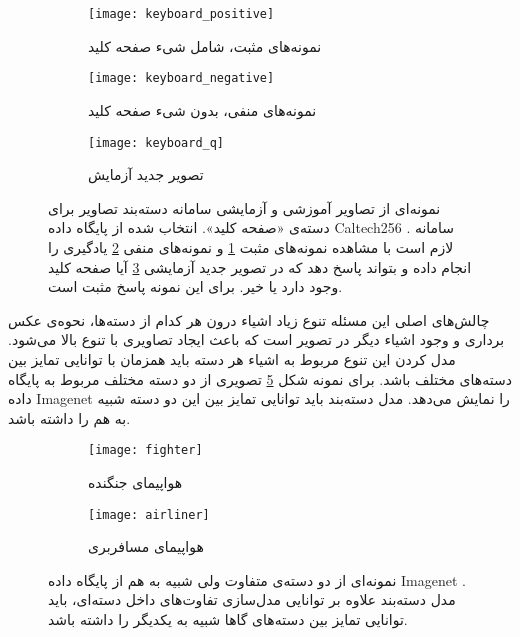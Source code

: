 \documentclass[11pt]{article}
\begin{document}
\begin{figure}[b!]
	\centering
	\begin{subfigure}[h]{0.5\textwidth}
		\texttt{[image: keyboard\_positive]}
		\caption{نمونه‌های مثبت، شامل شی‌ء صفحه کلید}
		\label{fig:intro:img_class_data:train_pos}
	\end{subfigure}
	\begin{subfigure}[h]{0.5\textwidth}
		\texttt{[image: keyboard\_negative]}
		\caption{نمونه‌های منفی، بدون شی‌ء صفحه کلید}
		\label{fig:intro:img_class_data:train_neg}
	\end{subfigure}
	\begin{subfigure}[h]{0.5\textwidth}
		\centering
		\texttt{[image: keyboard\_q]}
		\caption{تصویر جدید آزمایش}
		\label{fig:intro:img_class_data:query}
	\end{subfigure}
 
	\caption{نمونه‌ای از تصاویر آموزشی و آزمایشی سامانه دسته‌بند تصاویر برای دسته‌ی «صفحه کلید». انتخاب شده از پایگاه داده
Caltech256 \cite{caltech256}.
			سامانه لازم است با مشاهده نمونه‌های مثبت \ref{fig:intro:img_class_data:train_pos} و نمونه‌های منفی \ref{fig:intro:img_class_data:train_neg} یادگیری را انجام داده و بتواند پاسخ دهد که در تصویر جدید آزمایشی \ref{fig:intro:img_class_data:query} آیا صفحه کلید وجود دارد یا خیر. برای این نمونه پاسخ مثبت است.
			}
	\label{fig:intro:img_class_data}
\end{figure}
چالش‌های اصلی این مسئله تنوع زیاد اشیاء درون هر کدام از دسته‌ها، نحوه‌ی عکس برداری و وجود اشیاء دیگر در تصویر است که باعث ایجاد تصاویری با تنوع بالا می‌شود. مدل کردن این تنوع مربوط به اشیاء هر دسته باید همزمان با توانایی تمایز بین دسته‌های مختلف باشد. برای نمونه شکل
\ref{fig:intro:img_class_discrim}
تصویری از دو دسته مختلف مربوط به پایگاه داده
Imagenet \cite{imagenet}
را نمایش می‌دهد. مدل دسته‌بند باید توانایی تمایز بین این دو دسته شبیه به هم را داشته باشد.

\begin{figure}[t]
	\centering
	\begin{subfigure}[h]{0.35\textwidth}
		\centering
		\texttt{[image: fighter]}
		\caption{هواپیمای جنگنده}
	\end{subfigure}
	\begin{subfigure}[h]{0.35\textwidth}
		\centering
		\texttt{[image: airliner]}
		\caption{هواپیمای مسافربری}
	\end{subfigure}
	\caption{نمونه‌ای از دو دسته‌ی متفاوت ولی شبیه به هم از پایگاه داده
Imagenet \cite{imagenet}.
مدل دسته‌بند علاوه بر توانایی مدل‌سازی تفاوت‌های داخل دسته‌ای، باید توانایی تمایز بین دسته‌های گاها شبیه به یکدیگر را داشته باشد.
}
	\label{fig:intro:img_class_discrim}
\end{figure}
\end{document}
